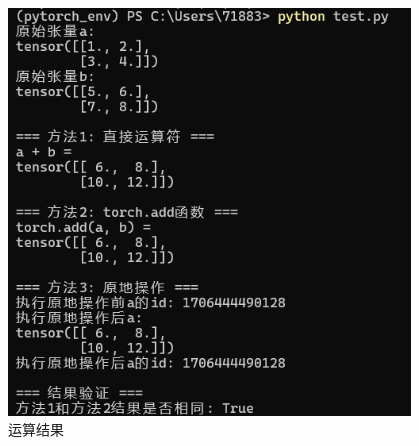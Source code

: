 \documentclass[UTF8]{ctexart}
\begin{document}
\begin{figure}[H]
    \centering
    \includegraphics[width=0.95\textwidth]{picture/三种运算结果.png}%
    \caption{运算结果}
\end{figure}
\end{document}

